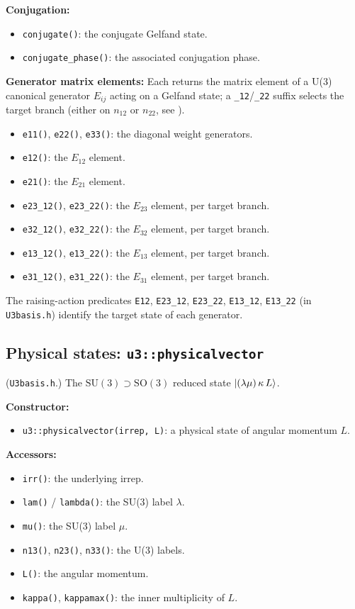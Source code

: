 \documentclass[aps,onecolumn,10pt,superscriptaddress,floatfix,nofootinbib]{revtex4}
\begin{document}
\textbf{Conjugation:}
\begin{itemize}
    \item \verb|conjugate()|: the conjugate Gelfand state.
    \item \verb|conjugate_phase()|: the associated conjugation phase.
\end{itemize}

\textbf{Generator matrix elements:} Each returns the matrix element of a U(3)
canonical generator $E_{ij}$ acting on a Gelfand state; a \verb|_12|/\verb|_22| suffix selects the
target branch (either on $n_{12}$ or $n_{22}$, see \cite{Dang2024EPJP1}).
\begin{itemize}
    \item \verb|e11()|, \verb|e22()|, \verb|e33()|: the diagonal weight generators.
    \item \verb|e12()|: the $E_{12}$ element.
    \item \verb|e21()|: the $E_{21}$ element.
    \item \verb|e23_12()|, \verb|e23_22()|: the $E_{23}$ element, per target branch.
    \item \verb|e32_12()|, \verb|e32_22()|: the $E_{32}$ element, per target branch.
    \item \verb|e13_12()|, \verb|e13_22()|: the $E_{13}$ element, per target branch.
    \item \verb|e31_12()|, \verb|e31_22()|: the $E_{31}$ element, per target branch.
\end{itemize}
The raising-action predicates \verb|E12|, \verb|E23_12|, \verb|E23_22|,
\verb|E13_12|, \verb|E13_22| (in \verb|U3basis.h|) identify the target state of
each generator.

\subsection{Physical states: \texttt{u3::physicalvector}}
(\verb|U3basis.h|.) The $\mathrm{SU(3)}\supset\mathrm{SO(3)}$ reduced state
$\ket{(\lambda\mu)\,\kappa\,L}$.

\textbf{Constructor:}
\begin{itemize}
    \item \verb|u3::physicalvector(irrep, L)|: a physical state of angular momentum $L$.
\end{itemize}

\textbf{Accessors:}
\begin{itemize}
    \item \verb|irr()|: the underlying irrep.
    \item \verb|lam()| / \verb|lambda()|: the SU(3) label $\lambda$.
    \item \verb|mu()|: the SU(3) label $\mu$.
    \item \verb|n13()|, \verb|n23()|, \verb|n33()|: the U(3) labels.
    \item \verb|L()|: the angular momentum.
    \item \verb|kappa()|, \verb|kappamax()|: the inner multiplicity of $L$.
\end{itemize}
\end{document}
